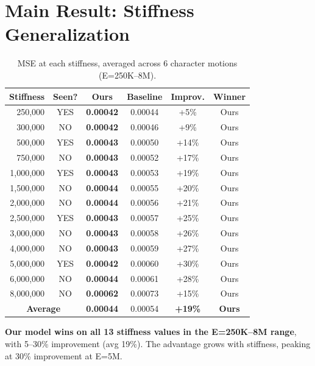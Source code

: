 \documentclass[10pt]{article}
\begin{document}
\section{Main Result: Stiffness Generalization}

\begin{table}[h]
\centering
\caption{MSE at each stiffness, averaged across 6 character motions (E=250K--8M).}
\small
\begin{tabular}{rc|cc|cc}
\toprule
\textbf{Stiffness} & \textbf{Seen?} & \cellcolor{best}\textbf{Ours} & \textbf{Baseline} & \textbf{Improv.} & \textbf{Winner} \\
\midrule
\rowcolor{best} 250,000 & YES & \textbf{0.00042} & 0.00044 & +5\% & Ours \\
\rowcolor{best} 300,000 & NO & \textbf{0.00042} & 0.00046 & +9\% & Ours \\
\rowcolor{best} 500,000 & YES & \textbf{0.00043} & 0.00050 & +14\% & Ours \\
\rowcolor{best} 750,000 & NO & \textbf{0.00043} & 0.00052 & +17\% & Ours \\
\rowcolor{best} 1,000,000 & YES & \textbf{0.00043} & 0.00053 & +19\% & Ours \\
\rowcolor{best} 1,500,000 & NO & \textbf{0.00044} & 0.00055 & +20\% & Ours \\
\rowcolor{best} 2,000,000 & NO & \textbf{0.00044} & 0.00056 & +21\% & Ours \\
\rowcolor{best} 2,500,000 & YES & \textbf{0.00043} & 0.00057 & +25\% & Ours \\
\rowcolor{best} 3,000,000 & NO & \textbf{0.00043} & 0.00058 & +26\% & Ours \\
\rowcolor{best} 4,000,000 & NO & \textbf{0.00043} & 0.00059 & +27\% & Ours \\
\rowcolor{best} 5,000,000 & YES & \textbf{0.00042} & 0.00060 & +30\% & Ours \\
\rowcolor{best} 6,000,000 & NO & \textbf{0.00044} & 0.00061 & +28\% & Ours \\
\rowcolor{best} 8,000,000 & NO & \textbf{0.00062} & 0.00073 & +15\% & Ours \\
\midrule
\multicolumn{2}{c|}{\textbf{Average}} & \cellcolor{best}\textbf{0.00044} & 0.00054 & \textbf{+19\%} & \textbf{Ours} \\
\bottomrule
\end{tabular}
\end{table}

\textbf{Our model wins on all 13 stiffness values in the E=250K--8M range}, with 5--30\% improvement (avg 19\%). The advantage grows with stiffness, peaking at 30\% improvement at E=5M.
\end{document}
